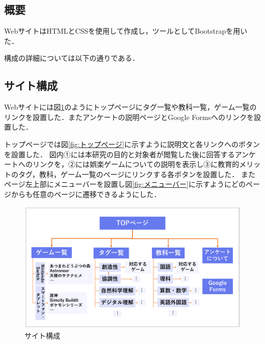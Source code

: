 \documentclass[12pt,a4j,titlepage]{ltjsarticle}
\begin{document}
\subsection{概要}
WebサイトはHTMLとCSSを使用して作成し，ツールとしてBootstrapを用いた．

構成の詳細については以下の通りである．

\subsection{サイト構成}
Webサイトには図\ref{fig:サイト構成}のようにトップページにタグ一覧や教科一覧，ゲーム一覧のリンクを設置した．またアンケートの説明ページとGoogle Formsへのリンクを設置した．

トップページでは図\ref{fig:トップページ}に示すように説明文と各リンクへのボタンを設置した．
図内①には本研究の目的と対象者が閲覧した後に回答するアンケートへのリンクを，②には娯楽ゲームについての説明を表示し③に教育的メリットのタグ，教科，ゲーム一覧のページにリンクする各ボタンを設置した．
またページ左上部にメニューバーを設置し図\ref{fig:メニューバー}に示すようにどのページからも任意のページに遷移できるようにした．

\begin{figure}[H]
\begin{center}
 \includegraphics[keepaspectratio, scale=0.35]{PDF/サイト構成.pdf}
\end{center}
 \caption{サイト構成}
 \label{fig:サイト構成}
\end{figure}
\end{document}
